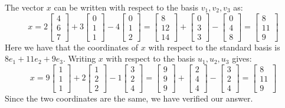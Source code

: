\documentclass{article}
\begin{document}
\noindent
The vector $x$ can be written with respect to the basis $v_1, v_2, v_3$ as:
$$
x = 2\begin{bmatrix} 4 \\ 6 \\ 7 \end{bmatrix} + 3\begin{bmatrix} 0 \\ 1 \\ 1 \end{bmatrix} - 4\begin{bmatrix} 0 \\ 1 \\ 2 \end{bmatrix} 
= \begin{bmatrix} 8 \\ 12 \\ 14 \end{bmatrix} + \begin{bmatrix} 0 \\ 3 \\ 3 \end{bmatrix} - \begin{bmatrix} 0 \\ 4 \\ 8 \end{bmatrix} 
= \begin{bmatrix} 8 \\ 11 \\ 9 \end{bmatrix}
$$
\noindent
Here we have that the coordinates of $x$ with respect to the standard basis is $8e_1 + 11e_2 + 9e_3$.
Writing $x$ with respect to the basis $u_1, u_2, u_3$ gives:
$$
x = 9\begin{bmatrix} 1 \\ 1 \\ 1 \end{bmatrix} + 2\begin{bmatrix} 1 \\ 2 \\ 2 \end{bmatrix} - 1\begin{bmatrix} 3 \\ 2 \\ 4 \end{bmatrix}
= \begin{bmatrix} 9 \\ 9 \\ 9 \end{bmatrix} + \begin{bmatrix} 2 \\ 4 \\ 4 \end{bmatrix} - \begin{bmatrix} 3 \\ 2 \\ 4 \end{bmatrix}
= \begin{bmatrix} 8 \\ 11 \\ 9 \end{bmatrix}
$$
\noindent
Since the two coordinates are the same, we have verified our answer.
\end{document}
